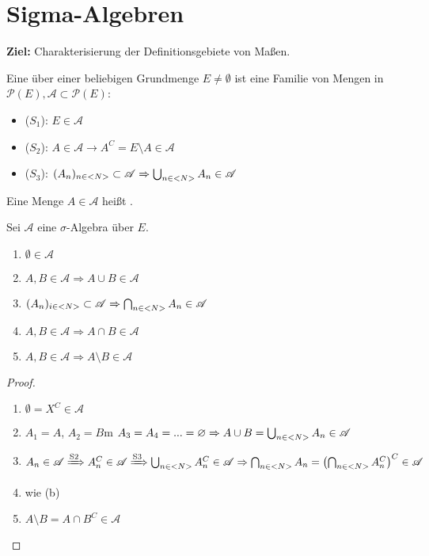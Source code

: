 \section{Sigma-Algebren}

\textbf{Ziel:} Charakterisierung der Definitionsgebiete von Maßen.

\begin{definition}
	Eine  über einer beliebigen Grundmenge $E \neq \emptyset$ ist eine Familie von Mengen in $\mathscr{P}(E), \mathscr{A} \subset \mathscr{P}(E)$:
	\begin{itemize}
		\item ($S_1$): $E \in \mathscr{A}$
		\item ($S_2$): $A \in \mathscr{A} \to A^C = E \setminus A \in \mathscr{A}$
		\item ($S_3$): $(A_n)_{n\in <N>} \subset \mathscr{A} \Rightarrow \bigcup_{n\in <N>}A_n \in \mathscr{A}$
	\end{itemize}
	Eine Menge $A\in\mathscr{A}$ heißt .
\end{definition}

\begin{proposition}
	Sei $\mathscr{A}$ eine $\sigma$-Algebra über $E$.
	\begin{enumerate}[label=(\alph*)]
		\item $\emptyset\in\mathscr{A}$
		\item $A,B\in\mathscr{A}\Rightarrow A\cup B\in\mathscr{A}$
		\item $(A_n)_{i\in<N>}\subset\mathscr{A}\Rightarrow\bigcap_{n\in <N>}A_n\in\mathscr{A}$
		\item $A,B\in\mathscr{A}\Rightarrow A\cap B\in\mathscr{A}$
		\item $A,B\in\mathscr{A}\Rightarrow A\setminus B\in\mathscr{A}$
	\end{enumerate}
\end{proposition}
\begin{proof}
	\begin{enumerate}[label=(\alph*)]
		\item $\emptyset=X^C\in\mathscr{A}$
		\item $A_1=A$, $A_2=B$m $A_3=A_4=...=\varnothing\Rightarrow A\cup B=\bigcup_{n\in <N>} A_n\in\mathscr{A}$
		\item $A_n\in\mathscr{A}\xRightarrow{\text{S2}}A_n^C\in\mathscr{A}\xRightarrow{\text{S3}}\bigcup_{n\in <N>} A_n^C\in\mathscr{A}\Rightarrow\bigcap_{n\in <N>}A_n=\left(\bigcap_{n\in <N>} A_n^C\right)^C\in\mathscr{A}$
		\item wie (b)
		\item $A\setminus B=A\cap B^C\in\mathscr{A}$
	\end{enumerate}
\end{proof}

